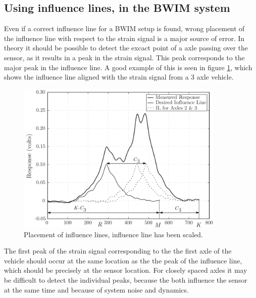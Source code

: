 \subsection{Using influence lines, in the BWIM system}
Even if a correct influence line for a BWIM setup is found, wrong placement of the influence line with respect to the strain signal is a major source of error. In theory it should be possible to detect the excact point of a axle passing over the sensor, as it results in a peak in the strain signal. This peak corresponds to the major peak in the influence line. A good example of this is seen in figure \ref{fig:strain_vs_influenceLine}, which shows the influence line aligned with the strain signal from a 3 axle vehicle.
\begin{figure}[htbp]
	\begin{adjustbox}{center}
		\includegraphics[width=0.9\textwidth]{figures/strain_vs_influenceline}
	\end{adjustbox}
	\caption{Placement of influence lines, influence line has been scaled.}
	\label{fig:strain_vs_influenceLine}
\end{figure}
The first peak of the strain signal corresponding to the the first axle of the vehicle should occur at the same location as the the peak of the influence line, which should be precisely at the sensor location.
For closely spaced axles it may be difficult to detect the individual peaks, because the both influence the sensor at the same time and because of system noise and dynamics.

